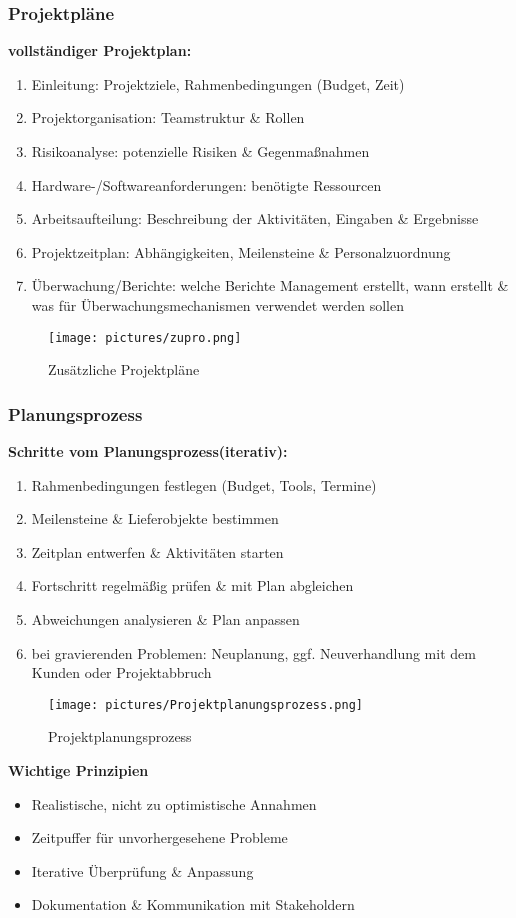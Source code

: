 \documentclass[12pt,a4paper,oneside]{article}
\begin{document}
\subsubsection{Projektpläne}

\textbf{vollständiger Projektplan:}
\begin{enumerate}
\item Einleitung: Projektziele, Rahmenbedingungen (Budget, Zeit)
\item Projektorganisation: Teamstruktur \& Rollen
\item Risikoanalyse: potenzielle Risiken \& Gegenmaßnahmen
\item Hardware-/Softwareanforderungen: benötigte Ressourcen
\item Arbeitsaufteilung: Beschreibung der Aktivitäten, Eingaben \& Ergebnisse
\item Projektzeitplan: Abhängigkeiten, Meilensteine \& Personalzuordnung
\item Überwachung/Berichte: welche Berichte Management erstellt, wann erstellt \& was für Überwachungsmechanismen verwendet werden sollen
\end{enumerate}

\begin{figure}[H]
\centering
\texttt{[image: pictures/zupro.png]}
\caption{Zusätzliche Projektpläne}
\end{figure}

\subsubsection{Planungsprozess}

\textbf{Schritte vom Planungsprozess(iterativ):}
\begin{enumerate}
\item Rahmenbedingungen festlegen (Budget, Tools, Termine)
\item Meilensteine \& Lieferobjekte bestimmen
\item Zeitplan entwerfen \& Aktivitäten starten
\item Fortschritt regelmäßig prüfen \& mit Plan abgleichen
\item Abweichungen analysieren \& Plan anpassen
\item bei gravierenden Problemen: Neuplanung, ggf. Neuverhandlung mit dem Kunden oder Projektabbruch
\end{enumerate}

\begin{figure}[H]
\centering
\texttt{[image: pictures/Projektplanungsprozess.png]}
\caption{Projektplanungsprozess}
\end{figure}

\textbf{Wichtige Prinzipien}
\begin{itemize}
\item Realistische, nicht zu optimistische Annahmen
\item Zeitpuffer für unvorhergesehene Probleme
\item Iterative Überprüfung \& Anpassung
\item Dokumentation \& Kommunikation mit Stakeholdern
\end{itemize}

\newpage

\nocite{*}
\end{document}
